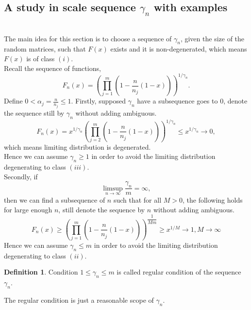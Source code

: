 \documentclass[12pt]{article}
\theoremstyle{plain}
\theoremstyle{definition}
\newtheorem{dfn}{\textbf{Definition}}
\theoremstyle{remark}
\begin{document}
\subsection{A study in scale sequence $\gamma_n$ with examples}\ \\
The main idea for this section is to choose a sequence of $\gamma_{n}$, given the size of the random matrices, such that $F(x)$ exists and it is non-degenerated, which means $F(x)$ is of class $(i)$.\\
Recall the sequence of functions,
\begin{equation*}
    F_{n}(x)=\left(\prod_{j=1}^{m}\left(1-\frac{n}{n_{j}}(1-x)\right)\right)^{1 / \gamma_{n}}.
\end{equation*}
Define $0<\alpha _j =\frac{n}{n_j}\leq 1$.
Firstly, supposed $\gamma_{n}$ have a subsequence goes to $0$, denote the sequence still by  $\gamma_{n}$ without adding ambiguous.
\begin{equation*}
    F_n(x)=x^{1 / \gamma_{n}} \left(\prod_{j=2}^{m}\left(1-\frac{n}{n_{j}}(1-x)\right)\right)^{1 / \gamma_{n}}\leq x^{1 / \gamma_{n}} \rightarrow 0,
\end{equation*}
which means limiting distribution is degenerated.\\
Hence we can assume $\gamma_{n}\geq 1$ in order to avoid the limiting distribution degenerating to class $(iii)$.\\
Secondly, if
\begin{equation*}
    \limsup _{n \rightarrow \infty}\dfrac{\gamma_{n}}{m}=\infty ,
\end{equation*}
then we can find a subsequence of $n$ such that for all $M>0$, the following holds for large enough $n$, still denote the sequence by  ${n}$ without adding ambiguous.
\begin{equation}
F_n(x)\geq\left(\prod_{j=1}^{m}\left(1-\frac{n}{n_{j}}(1-x)\right)\right)^{\dfrac{1}{Mm}}\geq x^{1 / M}\rightarrow 1, M\rightarrow \infty
\end{equation}
Hence we can assume $\gamma_{n}\leq m$ in order to avoid the limiting distribution degenerating to class $(ii)$.
\begin{dfn}
    Condition $1\leq \gamma_{n} \leq m$ is called regular condition of the sequence $\gamma_{n}$.
\end{dfn}
The regular condition is just a reasonable scope of $\gamma_{n}$. \\
\end{document}
